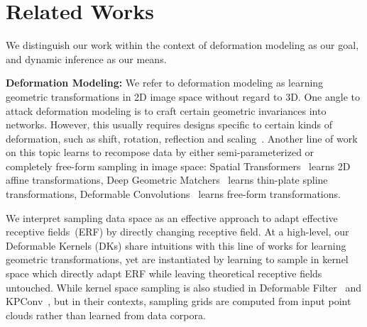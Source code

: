 \documentclass{article} \usepackage{iclr2020_conference, times}
\newcommand{\bfsection}[1]{\noindent\textbf{#1:}}
\begin{document}
 \section{Related Works}

We distinguish our work within the context of deformation modeling as our goal, and
dynamic inference as our means.


\bfsection{Deformation Modeling}
We refer to deformation modeling as learning geometric transformations in
2D image space without regard to 3D.
One angle to attack deformation modeling is to craft certain geometric
invariances into networks.
However, this usually requires designs specific to certain kinds of
deformation, such as shift, rotation, reflection and
scaling~\citep{sifre2013rotation,bruna2013invariant,kanazawa2014locally,cohen2016group,worrall2017harmonic,polar2018esteves}.
Another line of work on this topic learns to recompose data by either
semi-parameterized or completely free-form sampling in image space: Spatial
Transformers~\citep{jaderberg2015spatial} learns 2D affine transformations, Deep
Geometric Matchers~\citep{rocco2017convolutional} learns thin-plate spline
transformations, Deformable
Convolutions~\citep{dai2017deformable,zhu2019deformable} learns free-form
transformations.


We interpret sampling data space as an effective approach to adapt effective
receptive fields~(ERF) by directly changing receptive field.
At a high-level, our Deformable Kernels (DKs) share intuitions with this line
of works for learning geometric transformations, yet are instantiated by
learning to sample in kernel space which directly adapt ERF while leaving
theoretical receptive fields untouched.
While kernel space sampling is also studied in Deformable
Filter~\citep{xiong2019deformable} and KPConv~\citep{thomas2019kpconv}, but in
their contexts, sampling grids are computed from input point clouds rather than
learned from data corpora.
\end{document}
